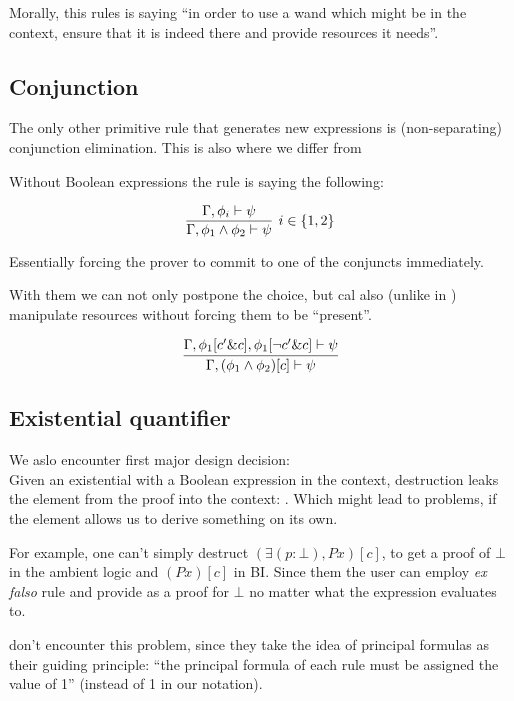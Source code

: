 Morally, this rules is saying ``in order to use a wand which might be in the context, ensure that it is indeed there and provide resources it needs''.

\subsection{Conjunction}

The only other primitive rule that generates new expressions is (non-separating) conjunction elimination.
This is also where we differ from \citet{harlandResourceDistributionBooleanConstraints2003}

Without Boolean expressions the rule is saying the following:

\[
\infer[ i \in \{1,2\} ]
      {\Gamma, \phi_1 \wedge \phi_2 \vdash \psi}
      {\Gamma, \phi_i \vdash \psi}
\]

Essentially forcing the prover to commit to one of the conjuncts immediately.

With them we can not only postpone the choice, but cal also (unlike in \cite{harlandResourceDistributionBooleanConstraints2003}) manipulate resources without forcing them to be ``present''.

\[
\infer{\Gamma, (\phi_1 \wedge \phi_2)[c] \vdash \psi}
      {\Gamma, \phi_1[c' \& c], \phi_1[\neg c' \& c] \vdash \psi}
\]

\subsection{Existential quantifier}
\label{subsec:exist-quant}

We aslo encounter first major design decision:\\
Given an existential with a Boolean expression in the context, destruction leaks the element from the proof into the context: .
Which might lead to problems, if the element allows us to derive something on its own.

For example, one can't simply destruct \((\exists (p : \bot), P x)[c]\), to get a proof of \(\bot\) in the ambient logic and \((P x)[c]\) in BI\@.
Since them the user can employ \emph{ex falso} rule and provide  as a proof for \(\bot\) no matter what the expression evaluates to.

\citet[page 5]{harlandResourceDistributionBooleanConstraints2003} don't encounter this problem, since they take the idea of principal formulas as their guiding principle: ``the principal formula of each rule must be assigned the value of 1'' (\true instead of 1 in our notation).

